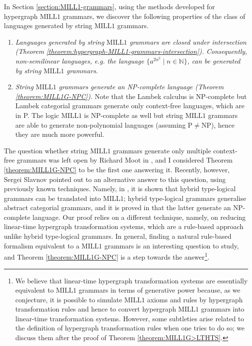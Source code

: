 \documentclass[a4paper,UKenglish,cleveref, autoref, thm-restate,pdfa]{lipics-v2021}
\newcommand{\Nat}{\mathbb{N}}
\newcommand{\MILLFO}{\mathrm{MILL}1}
\begin{document}
In Section \ref{section:MILL1-grammars}, using the methods developed for hypergraph $\MILLFO$ grammars, we discover the following properties of the class of languages generated by string $\MILLFO$ grammars.
\begin{enumerate}
	\item \emph{Languages generated by string $\MILLFO$ grammars are closed under intersection (Theorem \ref{theorem:hypergraph-MILL1-grammars-intersection}). Consequently, non-semilinear languages, e.g. the language $\{a^{2n^2} \mid n \in \Nat\}$, can be generated by string $\MILLFO$ grammars.}
	\item \emph{String $\MILLFO$ grammars generate an NP-complete language (Theorem \ref{theorem:MILL1G-NPC}).} Note that the Lambek calculus is NP-complete \cite{Pentus06} but Lambek categorial grammars generate only context-free languages, which are in P. The logic $\MILLFO$ is NP-complete as well but string $\MILLFO$ grammars are able to generate non-polynomial languages (assuming P$\ne$NP), hence they are much more powerful.
\end{enumerate}
The question whether string $\MILLFO$ grammars generate only multiple context-free grammars was left open by Richard Moot in \cite{Moot14}, and I considered Theorem \ref{theorem:MILL1G-NPC} to be the first one answering it. Recently, however, Sergei Slavnov pointed out to an alternative answer to this question, using previously known techniques. Namely, in \cite{Moot14b}, it is shown that hybrid type-logical grammars can be translated into $\MILLFO$; hybrid type-logical grammars generalise abstract categorial grammars, and it is proved in \cite{Salvati10} that the latter generate an NP-complete language.
Our proof relies on a different technique, namely, on reducing linear-time hypergraph transformation systems, which are a rule-based approach unlike hybrid type-logical grammars. In general, finding a natural rule-based formalism equivalent to a $\MILLFO$ grammars is an interesting question to study, and Theorem \ref{theorem:MILL1G-NPC} is a step towards the answer\footnote{We believe that linear-time hypergraph transformation systems are essentially equivalent to $\MILLFO$ grammars in terms of generative power because, as we conjecture, it is possible to simulate $\MILLFO$ axioms and rules by hypergraph transformation rules and hence to convert hypergraph $\MILLFO$ grammars into linear-time transformation systems. However, some subtleties arise related to the definition of hypergraph transformation rules when one tries to do so; we discuss them after the proof of Theorem \ref{theorem:MILL1G>LTHTS}.}.
\end{document}

